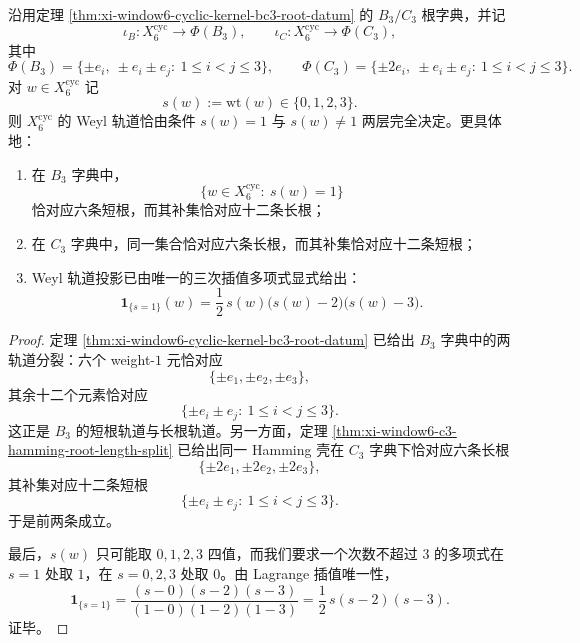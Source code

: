 \begin{theorem}\label{thm:xi-time-part9r-window6-hamming-complete-weyl-orbit-invariant}
沿用定理 \ref{thm:xi-window6-cyclic-kernel-bc3-root-datum} 的 \(B_3/C_3\) 根字典，并记
\[
\iota_B:X_6^{\mathrm{cyc}}\to \Phi(B_3),
\qquad
\iota_C:X_6^{\mathrm{cyc}}\to \Phi(C_3),
\]
其中
\[
\Phi(B_3)=\{\pm e_i,\ \pm e_i\pm e_j:\ 1\le i<j\le 3\},
\qquad
\Phi(C_3)=\{\pm 2e_i,\ \pm e_i\pm e_j:\ 1\le i<j\le 3\}.
\]
对 \(w\in X_6^{\mathrm{cyc}}\) 记
\[
s(w):=\mathrm{wt}(w)\in\{0,1,2,3\}.
\]
则 \(X_6^{\mathrm{cyc}}\) 的 Weyl 轨道恰由条件 \(s(w)=1\) 与 \(s(w)\neq 1\) 两层完全决定。更具体地：
\begin{enumerate}
  \item 在 \(B_3\) 字典中，
  \[
  \{w\in X_6^{\mathrm{cyc}}:\ s(w)=1\}
  \]
  恰对应六条短根，而其补集恰对应十二条长根；
  \item 在 \(C_3\) 字典中，同一集合恰对应六条长根，而其补集恰对应十二条短根；
  \item Weyl 轨道投影已由唯一的三次插值多项式显式给出：
  \[
  \mathbf 1_{\{s=1\}}(w)
  =
  \frac12\,s(w)\bigl(s(w)-2\bigr)\bigl(s(w)-3\bigr).
  \]
\end{enumerate}
\end{theorem}
\begin{proof}
定理 \ref{thm:xi-window6-cyclic-kernel-bc3-root-datum} 已给出 \(B_3\) 字典中的两轨道分裂：六个 weight-\(1\) 元恰对应
\[
\{\pm e_1,\pm e_2,\pm e_3\},
\]
其余十二个元素恰对应
\[
\{\pm e_i\pm e_j:\ 1\le i<j\le 3\}.
\]
这正是 \(B_3\) 的短根轨道与长根轨道。另一方面，定理 \ref{thm:xi-window6-c3-hamming-root-length-split} 已给出同一 Hamming 壳在 \(C_3\) 字典下恰对应六条长根
\[
\{\pm 2e_1,\pm 2e_2,\pm 2e_3\},
\]
其补集对应十二条短根
\[
\{\pm e_i\pm e_j:\ 1\le i<j\le 3\}.
\]
于是前两条成立。

最后，\(s(w)\) 只可能取 \(0,1,2,3\) 四值，而我们要求一个次数不超过 \(3\) 的多项式在 \(s=1\) 处取 \(1\)，在 \(s=0,2,3\) 处取 \(0\)。由 Lagrange 插值唯一性，
\[
\mathbf 1_{\{s=1\}}
=
\frac{(s-0)(s-2)(s-3)}{(1-0)(1-2)(1-3)}
=
\frac12\,s(s-2)(s-3).
\]
证毕。
\end{proof}


